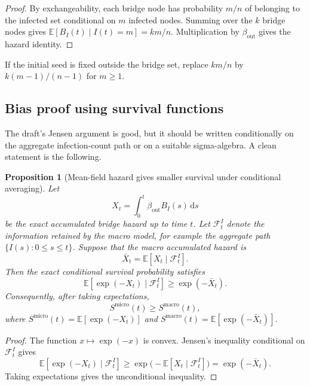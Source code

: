 \documentclass[12pt,a4paper]{article}
\newtheorem{proposition}{Proposition}
\theoremstyle{definition}
\newcommand{\E}{\mathbb{E}}
\newcommand{\1}{\mathbf{1}}
\newcommand{\dint}{\,\mathrm{d}}
\begin{document}
\begin{proof}
By exchangeability, each bridge node has probability $m/n$ of belonging to the infected set conditional on $m$ infected nodes.  Summing over the $k$ bridge nodes gives $\E[B_I(t)\mid I(t)=m]=km/n$.  Multiplication by $\beta_{\mathrm{out}}$ gives the hazard identity.
\end{proof}

If the initial seed is fixed outside the bridge set, replace $km/n$ by $k(m-1)/(n-1)$ for $m\ge 1$.

\subsection{Bias proof using survival functions}

The draft's Jensen argument is good, but it should be written conditionally on the aggregate infection-count path or on a suitable sigma-algebra.  A clean statement is the following.

\begin{proposition}[Mean-field hazard gives smaller survival under conditional averaging]
Let
\begin{equation}
    X_t=\int_0^t \beta_{\mathrm{out}}B_I(s)\dint s
\end{equation}
be the exact accumulated bridge hazard up to time $t$.  Let $\mathcal F_t^I$ denote the information retained by the macro model, for example the aggregate path $\{I(s):0\le s\le t\}$.  Suppose that the macro accumulated hazard is
\begin{equation}
    \bar X_t=\E[X_t\mid \mathcal F_t^I].
\end{equation}
Then the exact conditional survival probability satisfies
\begin{equation}
    \E[\exp(-X_t)\mid \mathcal F_t^I]\ge \exp(-\bar X_t).
\end{equation}
Consequently, after taking expectations,
\begin{equation}
    S^{\mathrm{micro}}(t)\ge S^{\mathrm{macro}}(t),
\end{equation}
where $S^{\mathrm{micro}}(t)=\E[\exp(-X_t)]$ and $S^{\mathrm{macro}}(t)=\E[\exp(-\bar X_t)]$.
\end{proposition}

\begin{proof}
The function $x\mapsto \exp(-x)$ is convex.  Jensen's inequality conditional on $\mathcal F_t^I$ gives
\begin{equation}
    \E[\exp(-X_t)\mid \mathcal F_t^I]
    \ge \exp\bigl(-\E[X_t\mid\mathcal F_t^I]\bigr)
    =\exp(-\bar X_t).
\end{equation}
Taking expectations gives the unconditional inequality.
\end{proof}
\end{document}
